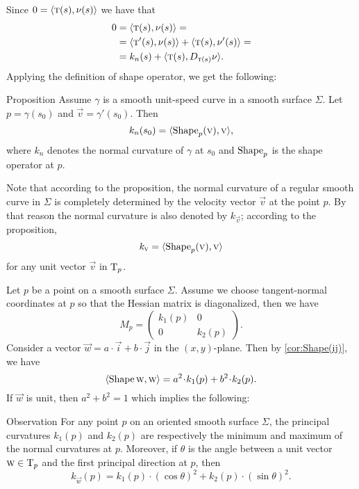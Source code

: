Since $0=\langle \text{\sc{t}}(s),\nu(s)\rangle$ we have 
that 
\begin{align*}
0&=\langle \text{\sc{t}}(s),\nu(s)\rangle=
\\
&=\langle \text{\sc{t}}'(s),\nu(s)\rangle+\langle \text{\sc{t}}(s),\nu'(s)\rangle=
\\
&=k_n(s)+\langle \text{\sc{t}}(s),D_{\text{\sc{t}}(s)}\nu\rangle.
\end{align*}
Applying the definition of shape operator,
we get the following:

\begin{thm}{Proposition}\label{prop:normal-shape}
Assume $\gamma$ is a smooth unit-speed curve in a smooth surface $\Sigma$.
Let $p=\gamma(s_0)$ and $\vec v=\gamma'(s_0)$.
Then 
\[k_n(s_0)=\langle \mathop{\rm Shape}\nolimits_p(\text{\sc{v}}),\text{\sc{v}}\rangle,\]
where $k_n$ denotes the normal curvature of $\gamma$ at $s_0$ and $\mathop{\rm Shape}\nolimits_p$ is the shape operator at $p$.
\end{thm}

Note that according to the proposition, the normal curvature of a regular smooth curve in $\Sigma$ is completely determined by the velocity vector $\vec v$ at the point $p$.
By that reason the normal curvature is also denoted by $k_{\vec v}$;
according to the proposition,
\[k_{\text{\sc{v}}}=\langle \mathop{\rm Shape}\nolimits_p(\text{\sc{v}}),\text{\sc{v}}\rangle\]
for any unit vector $\vec v$ in $\mathrm{T}_p$.

Let $p$ be a point on a smooth surface $\Sigma$.
Assume we choose tangent-normal coordinates at $p$ so that the Hessian matrix is diagonalized, then we have
\[M_p=\begin{pmatrix}
   k_1(p)
   &0
   \\
   0
   &k_2(p)
  \end{pmatrix}.
\]
Consider a vector ${\vec w}=a\cdot\vec i+b\cdot\vec j$ in the $(x,y)$-plane.
Then by \ref{cor:Shape(ij)}, we have
\[
\langle \Shape\vec w,\vec w\rangle
=a^2\cdot k_1(p) +b^2\cdot k_2(p). 
\]
If ${\vec w}$ is unit, then $a^2+b^2=1$ which implies the following:

\begin{thm}{Observation}\label{obs:k1-k2}
For any point $p$ on an oriented smooth surface $\Sigma$,
the principal curvatures $k_1(p)$ and $k_2(p)$ are respectively the minimum and maximum of the normal curvatures at $p$.
Moreover, if $\theta$ is the angle between a unit vector ${\text{\sc{w}}}\in\mathrm{T}_p$ and the first principal direction at $p$, then 
\[k_{\vec w}(p)=k_1(p)\cdot(\cos\theta)^2+k_2(p)\cdot(\sin\theta)^2.\]

\end{thm}

